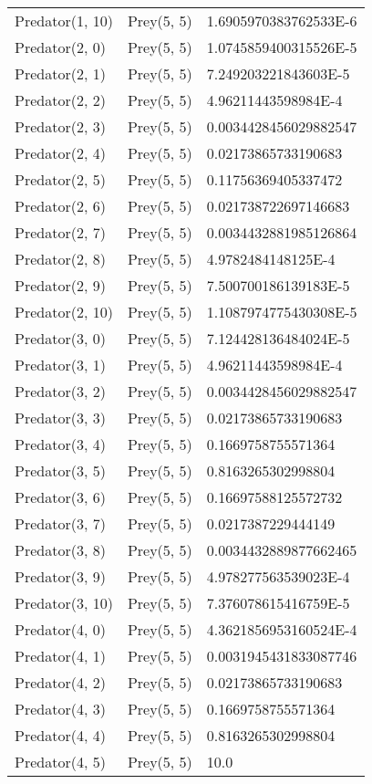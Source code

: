 \begin{longtable}{| p{} | p{} | p{} |}
Predator(1, 10) & Prey(5, 5) &1.6905970383762533E-6\\
Predator(2, 0) & Prey(5, 5) &1.0745859400315526E-5\\
Predator(2, 1) & Prey(5, 5) &7.249203221843603E-5\\
Predator(2, 2) & Prey(5, 5) &4.96211443598984E-4\\
Predator(2, 3) & Prey(5, 5) &0.0034428456029882547\\
Predator(2, 4) & Prey(5, 5) &0.02173865733190683\\
Predator(2, 5) & Prey(5, 5) &0.11756369405337472\\
Predator(2, 6) & Prey(5, 5) &0.021738722697146683\\
Predator(2, 7) & Prey(5, 5) &0.0034432881985126864\\
Predator(2, 8) & Prey(5, 5) &4.9782484148125E-4\\
Predator(2, 9) & Prey(5, 5) &7.500700186139183E-5\\
Predator(2, 10) & Prey(5, 5) &1.1087974775430308E-5\\
Predator(3, 0) & Prey(5, 5) &7.124428136484024E-5\\
Predator(3, 1) & Prey(5, 5) &4.96211443598984E-4\\
Predator(3, 2) & Prey(5, 5) &0.0034428456029882547\\
Predator(3, 3) & Prey(5, 5) &0.02173865733190683\\
Predator(3, 4) & Prey(5, 5) &0.1669758755571364\\
Predator(3, 5) & Prey(5, 5) &0.8163265302998804\\
Predator(3, 6) & Prey(5, 5) &0.16697588125572732\\
Predator(3, 7) & Prey(5, 5) &0.0217387229444149\\
Predator(3, 8) & Prey(5, 5) &0.0034432889877662465\\
Predator(3, 9) & Prey(5, 5) &4.978277563539023E-4\\
Predator(3, 10) & Prey(5, 5) &7.376078615416759E-5\\
Predator(4, 0) & Prey(5, 5) &4.3621856953160524E-4\\
Predator(4, 1) & Prey(5, 5) &0.0031945431833087746\\
Predator(4, 2) & Prey(5, 5) &0.02173865733190683\\
Predator(4, 3) & Prey(5, 5) &0.1669758755571364\\
Predator(4, 4) & Prey(5, 5) &0.8163265302998804\\
Predator(4, 5) & Prey(5, 5) &10.0\\

\end{longtable}
